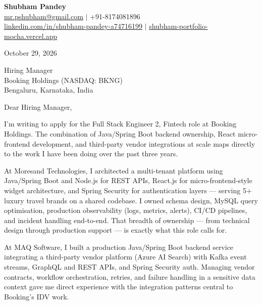 \documentclass[a4paper,11pt]{article}
\begin{document}
\begin{center}
  {\LARGE \textbf{Shubham Pandey}} \\[4pt]
  \href{mailto:mr.pshubham@gmail.com}{mr.pshubham@gmail.com} \quad $|$ \quad +91-8174081896 \\
  \href{https://www.linkedin.com/in/shubham-pandey-a74716199/}{linkedin.com/in/shubham-pandey-a74716199} \quad $|$ \quad \href{https://shubham-portfolio-mocha.vercel.app/}{shubham-portfolio-mocha.vercel.app}
\end{center}

\vspace{12pt}

October 29, 2026

\vspace{8pt}

Hiring Manager \\
Booking Holdings (NASDAQ: BKNG) \\
Bengaluru, Karnataka, India

\vspace{12pt}

Dear Hiring Manager,

\vspace{6pt}

I'm writing to apply for the Full Stack Engineer 2, Fintech role at Booking Holdings. The combination of Java/Spring Boot backend ownership, React micro-frontend development, and third-party vendor integrations at scale maps directly to the work I have been doing over the past three years.

\vspace{6pt}

At Moresand Technologies, I architected a multi-tenant platform using Java/Spring Boot and Node.js for REST APIs, React.js for micro-frontend-style widget architecture, and Spring Security for authentication layers --- serving 5+ luxury travel brands on a shared codebase. I owned schema design, MySQL query optimisation, production observability (logs, metrics, alerts), CI/CD pipelines, and incident handling end-to-end. That breadth of ownership --- from technical design through production support --- is exactly what this role calls for.

\vspace{6pt}

At MAQ Software, I built a production Java/Spring Boot backend service integrating a third-party vendor platform (Azure AI Search) with Kafka event streams, GraphQL and REST APIs, and Spring Security auth. Managing vendor contracts, workflow orchestration, retries, and failure handling in a sensitive data context gave me direct experience with the integration patterns central to Booking's IDV work.
\end{document}
